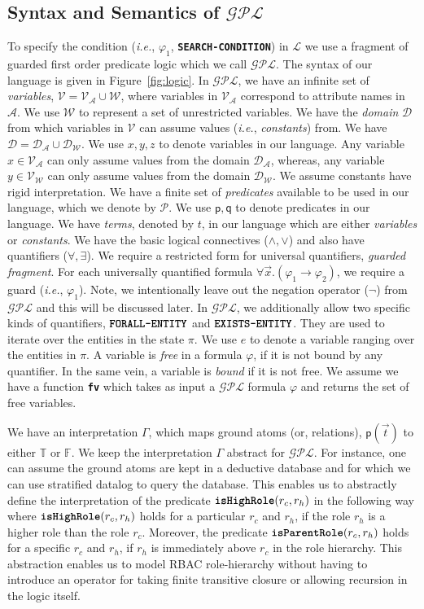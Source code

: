 \documentclass{sig-alternate}
\newcommand{\ie}{\textit{i.e.}\xspace}
\newcommand{\state}{\ensuremath{\pi}\xspace}
\newcommand{\planguage}{\ensuremath{\mathbf{\mathcal{GPL}}}\xspace}
\newcommand{\cD}{\ensuremath{\mathcal{D}}\xspace}
\newcommand{\cA}{\ensuremath{\mathcal{A}}\xspace}
\newcommand{\funcname}[1]{\textbf{\texttt{#1}}}
\newcommand{\policy}{\ensuremath{\varphi}\xspace}
\newcommand{\cL}{\ensuremath{\mathcal{L}}\xspace}
\newcommand{\cP}{\ensuremath{\mathcal{P}}\xspace}
\newcommand{\true}{\ensuremath{\mathbb{T}}\xspace}
\newcommand{\false}{\ensuremath{\mathbb{F}}\xspace}
\newcommand{\pred}[1]{\ensuremath{\mathsf{#1}}\xspace}
\newcommand{\foralle}{\ensuremath{\funcname{FORALL-ENTITY}}\xspace}
\newcommand{\existse}{\ensuremath{\funcname{EXISTS-ENTITY}}\xspace}
\newcommand{\cV}{\ensuremath{\mathcal{V}}\xspace}
\newcommand{\cW}{\ensuremath{\mathcal{W}}\xspace}
\begin{document}
\subsection{Syntax and Semantics of \planguage}
\label{sec:condition}
To specify the condition (\ie, $\policy_1$, \funcname{SEARCH-CONDITION}) in \cL we use a fragment of guarded first order predicate logic which we call \planguage. 
The syntax of our language is given in Figure~\ref{fig:logic}. In \planguage, we have an infinite set of \emph{variables}, $\cV = \cV_{\cA} \cup \cW$, 
where variables in $\cV_{\cA}$ correspond to attribute names in \cA. We use \cW to represent 
a set of unrestricted variables. We have the \emph{domain} \cD from which variables in \cV can assume values (\ie, \emph{constants}) from. 
We have $\cD = \cD_{\cA}\cup \cD_{\cW}$. We use $x, y, z$ to denote variables in our language. Any variable $x\in\cV_{\cA}$ 
can only assume values from the domain $\cD_{\cA}$, whereas, any variable $y\in\cV_{\cW}$ can only assume values from the 
domain $\cD_{\cW}$. We assume constants have rigid interpretation. 
We have a  finite set of \emph{predicates} available to be used in our language, which we denote by \cP. We use 
$\pred{p}, \pred{q}$ to denote predicates in our language. We have \emph{terms}, denoted by $t$, in our language which are either 
\emph{variables} or \emph{constants}. We have the basic logical connectives ($\wedge, \vee$) and also have quantifiers ($\forall, \exists$). 
We require a restricted form for universal quantifiers, \emph{guarded fragment}. For each universally quantified formula $\forall \vec{x}.(\policy_1\rightarrow\policy_2)$, 
we require a guard (\ie, $\policy_1$). Note, we intentionally leave out the negation operator ($\neg$) from \planguage and this will be discussed 
later. In \planguage, we additionally allow two specific kinds of quantifiers, \foralle and \existse. They are used to 
iterate over the entities in the state \state. 
We use $e$ to denote a variable ranging over the entities in \state. 
A variable is \emph{free} in a formula \policy, if it is not bound by any quantifier. 
In the same vein, a variable is \emph{bound} if it is not free. We assume we have a function \funcname{fv} which takes as input 
a \planguage formula \policy and returns the set of free variables. 

We have an interpretation $\Gamma$, which maps ground atoms (or, relations), $\pred{p}(\vec{t})$ to either \true or \false. 
We keep the interpretation $\Gamma$ abstract for \planguage. For instance, one can assume the ground atoms are 
kept in a deductive database and for which we can use stratified datalog to query the database. 
This enables us to abstractly define the interpretation of the predicate $\funcname{isHighRole}(r_c, r_h)$ 
in the following way where $\funcname{isHighRole}(r_c, r_h)$ holds for a particular $r_c$ and $r_h$, if 
the role $r_h$ is a higher role than the role $r_c$. Moreover, the predicate $\funcname{isParentRole}(r_c, r_h)$ holds 
for a specific $r_c$ and $r_h$, if $r_h$ is immediately above $r_c$ in the role hierarchy. This abstraction enables us 
to model RBAC role-hierarchy without having to introduce an operator for taking finite transitive closure or allowing 
recursion in the logic itself.
\end{document}
